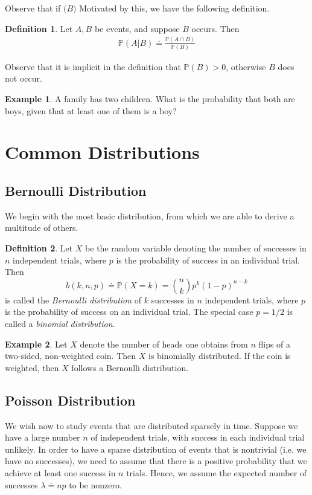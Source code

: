 \documentclass[12pt]{article}
\newcommand{\prob}{\mathbb{P}}
\theoremstyle{plain}
\theoremstyle{definition}
\newtheorem*{definition}{Definition}
\newtheorem*{example}{Example}
\theoremstyle{remark}
\numberwithin{equation}{section}  %
\begin{document}
Observe that if $\mathbb(B)$
Motivated by this, we have the following definition.
\begin{definition}
Let $A, B$ be events, and suppose $B$ occurs. Then
\begin{align*}
\prob(A | B) \doteq \frac{\prob(A \cap B)}{\prob(B)}
\end{align*}
\end{definition}
Observe that it is implicit in the definition that $\prob(B) > 0$, otherwise
$B$ does not occur.
\begin{example}
A family has two children. What is the probability that both are boys,
given that at least one of them is a boy?
\end{example}
\section{Common Distributions}
\subsection{Bernoulli Distribution}
We begin with the most basic distribution, from which
we are able to derive a multitude of others.
\begin{definition}
Let $X$ be the random variable denoting the number of successes
in $n$ independent trials, where $p$ is the probability of success in 
an individual trial. Then
\begin{equation*}
b(k, n, p) \doteq \mathbb{P}(X = k) = \binom{n}{k} p^k (1 - p)^{n-k}
\end{equation*}
is called the \emph{Bernoulli distribution} of $k$ successes
in $n$ independent trials, where $p$ is the probability of success on an
individual trial. The special case
$p = 1/2$ is called a \emph{binomial distribution}. 
\end{definition}
\begin{example}
Let $X$ denote the number of heads one obtains from $n$ flips of a
two-sided, non-weighted coin. Then $X$ is binomially distributed.
If the coin is weighted, then $X$ follows a Bernoulli distribution.
\end{example}
\subsection{Poisson Distribution}
We wish now to study events that are distributed sparsely in time.
Suppose we have a large number $n$ of independent trials, with
success in each individual trial unlikely. In order to have a sparse
distribution of events that is nontrivial (i.e. we have no successes),
we need to assume that there is a positive
probability that we achieve at least one success in $n$ trials. Hence, we assume the expected number of 
successes $\lambda \doteq np$ to be nonzero. 
\end{document}
